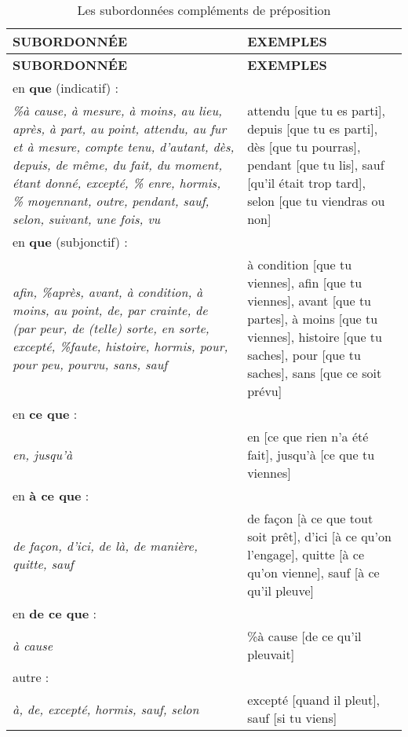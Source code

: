 \documentclass[UTF8]{report}
\begin{document}
\begin{table}[H]
    \centering
    \begin{longtable}{|m{7cm}|m{8cm}|}
    \hline
    \textbf{SUBORDONNÉE} & \textbf{EXEMPLES} \\
    \hline
    \endfirsthead
    \hline
    \textbf{SUBORDONNÉE} & \textbf{EXEMPLES} \\
    \hline
    \endhead
    \hline
    \endfoot
    \hline
    \endlastfoot
    
    
    
    en \textbf{que} (indicatif) : & \\
    \textit{\%à cause, à mesure, à moins, au lieu, après, à part, au point, attendu, au fur et à mesure, compte tenu, d'autant, dès, depuis, de même, du fait, du moment, étant donné, excepté, \% enre, hormis, \% moyennant, outre, pendant, sauf, selon, suivant, une fois, vu} & attendu [que tu es parti], depuis [que tu es parti], dès [que tu pourras], pendant [que tu lis], sauf [qu'il était trop tard], selon [que tu viendras ou non] \\
    \hline
    en \textbf{que} (subjonctif) : & \\
    \textit{afin, \%après, avant, à condition, à moins, au point, de, par crainte, de (par peur, de (telle) sorte, en sorte, excepté, \%faute, histoire, hormis, pour, pour peu, pourvu, sans, sauf} & à condition [que tu viennes], afin [que tu viennes], avant [que tu partes], à moins [que tu viennes], histoire [que tu saches], pour [que tu saches], sans [que ce soit prévu] \\
    \hline
    en \textbf{ce que} : & \\
    \textit{en, jusqu'à} & en [ce que rien n'a été fait], jusqu'à [ce que tu viennes] \\
    \hline
    en \textbf{à ce que} : & \\
    \textit{de façon, d'ici, de là, de manière, quitte, sauf} & de façon [à ce que tout soit prêt], d'ici [à ce qu'on l'engage], quitte [à ce qu'on vienne], sauf [à ce qu'il pleuve] \\
    \hline
    en \textbf{de ce que} : & \\
    \textit{à cause} & \%à cause [de ce qu'il pleuvait] \\
    \hline
    autre : & \\
    \textit{à, de, excepté, hormis, sauf, selon} & excepté [quand il pleut], sauf [si tu viens] \\
    \hline
    \end{longtable}
    \caption{Les subordonnées compléments de préposition}
\end{table}
\end{document}
